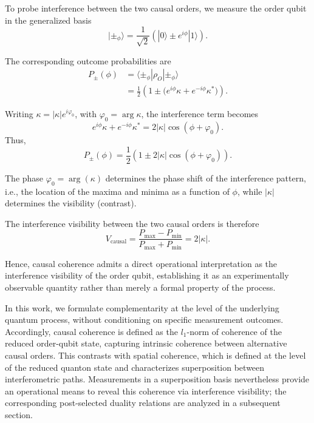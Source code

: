 \documentclass[aps,pra,reprint,superscriptaddress]{revtex4-2}
\begin{document}
To probe interference between the two causal orders, we measure the order qubit in the generalized basis
\begin{equation}
|\pm_\phi\rangle = \frac{1}{\sqrt{2}}
\left( |0\rangle \pm e^{i\phi}|1\rangle \right).
\end{equation}

The corresponding outcome probabilities are
\begin{align}
P_\pm(\phi)
&= \langle \pm_\phi | \rho_O | \pm_\phi \rangle
\nonumber\\
&= \frac12 \left( 1 \pm \bigl( e^{i\phi}\kappa + e^{-i\phi}\kappa^* \bigr) \right).
\label{eq:prob_general}
\end{align}

Writing $\kappa = |\kappa| e^{i\varphi_0}$, with $\varphi_0 = \arg \kappa$, the interference term becomes
\begin{equation}
e^{i\phi}\kappa + e^{-i\phi}\kappa^*
= 2|\kappa|\cos(\phi + \varphi_0).
\end{equation}
Thus,
\begin{equation}
P_\pm(\phi) = \frac12 \left( 1 \pm 2|\kappa|\cos(\phi + \varphi_0) \right).
\label{eq:prob_cosine}
\end{equation}

The phase $\varphi_0=\arg(\kappa)$ determines the phase shift of the interference pattern, i.e., the location of the maxima and minima as a function of $\phi$, while $|\kappa|$ determines the visibility (contrast).

\medskip

The interference visibility between the two causal orders is therefore
\begin{equation}
V_{\mathrm{causal}} = \frac{P_{\max}-P_{\min}}{P_{\max}+P_{\min}} = 2|\kappa|.
\end{equation}

Hence, causal coherence admits a direct operational interpretation as the interference visibility of the order qubit, establishing it as an experimentally observable quantity rather than merely a formal property of the process.

In this work, we formulate complementarity at the level of the underlying quantum process, without conditioning on specific measurement outcomes. Accordingly, causal coherence is defined as the $l_1$-norm of coherence of the reduced order-qubit state, capturing intrinsic coherence between alternative causal orders. This contrasts with spatial coherence, which is defined at the level of the reduced quanton state and characterizes superposition between interferometric paths. Measurements in a superposition basis nevertheless provide an operational means to reveal this coherence via interference visibility; the corresponding post-selected duality relations are analyzed in a subsequent section.
\end{document}
